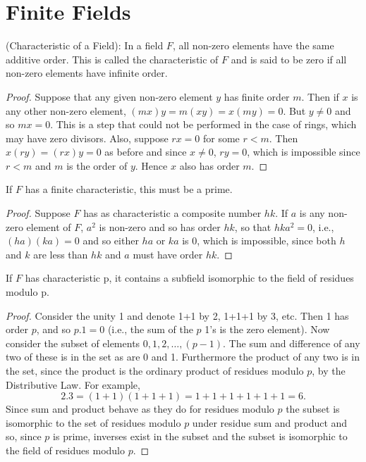 \section{Finite Fields}

\begin{theorem}{(Characteristic of a Field):}
In a field $F$, all non-zero elements have the same additive order. This is called the {\rm characteristic} of $F$ and is said to be zero if all non-zero elements have infinite order. 
\end{theorem}

\begin{proof}
Suppose that any given non-zero element $y$ has finite order $m$. Then if $x$ is any other non-zero element, $ (mx)y = m(xy) = x(my) = 0$. But $y\ne 0$ and so $mx = 0$. This is a step that could not be performed in the case of rings, which may have zero divisors. Also, suppose $rx = 0$ for some $r<m$. Then $x(ry) = (rx)y = 0$ as before and since $x\ne 0$, $ry = 0$, which is impossible since $r<m$ and $m$ is the order of $y$. Hence $x$ also has order $m$. 
\end{proof}

\begin{theorem}
If $F$ has a finite characteristic, this must be a prime.
\end{theorem}

\begin{proof}
Suppose $F$ has as characteristic a composite number $hk$. If $a$ is any non-zero element of $F$, $a^2$ is non-zero and so has order $hk$, so that $hka^2 = 0$, i.e., $(ha)(ka) = 0$ and so either $ha$ or $ka$ is 0, which is impossible, since both $h$ and $k$ are less than $hk$ and $a$ must have order $hk$.  
\end{proof}

\begin{theorem}
If $F$ has characteristic p, it contains a subfield isomorphic to the field of residues modulo p.
\end{theorem}

\begin{proof}
Consider the unity 1 and denote 1+1 by 2, 1+1+1 by 3, etc. Then 1 has order $p$, and so $p.1 = 0$ (i.e., the sum of the $p$ 1's is the zero element).  Now consider the subset of elements $0,1,2,\hdots,(p-1)$. The sum and difference of any two of these is in the set as are 0 and 1. Furthermore the product of any two is in the set, since the product is the ordinary product of residues modulo $p$, by the Distributive Law. For example, $$2.3 = (1+1)(1+1+1) = 1+1+1+1+1+1 = 6.$$ Since sum and product behave as they do for residues modulo $p$ the subset is isomorphic to the set of residues modulo $p$  under residue sum and product and so, since $p$ is prime, inverses exist in the subset and the subset is isomorphic to the field of residues modulo $p$.
\end{proof}

